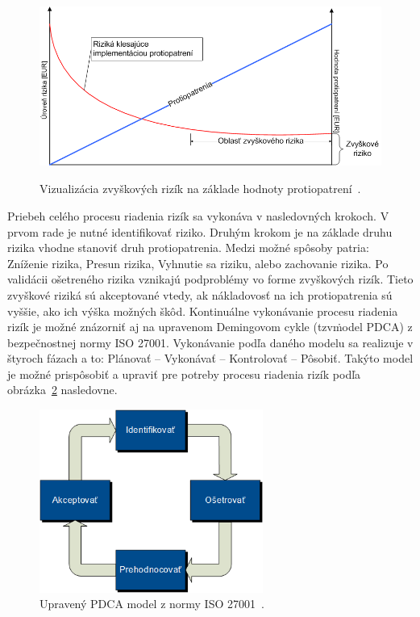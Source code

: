 \begin{figure}[H]
\begin{center}\includegraphics[width=\textwidth,height=6cm,keepaspectratio=true]{assets/zvyskove_riziko.png}\end{center}
\caption[Vizualizácia zvyškových rizík na základe hodnoty protiopatrení]{Vizualizácia zvyškových rizík na základe hodnoty protiopatrení~\cite{RiadenieRizik}.}\label{fig:obr_3}
\end{figure}

Priebeh celého procesu riadenia rizík sa vykonáva v nasledovných krokoch.
V prvom rade je nutné identifikovať riziko.
Druhým krokom je na základe druhu rizika vhodne stanoviť druh protiopatrenia.
Medzi možné spôsoby patria: Zníženie rizika, Presun rizika, Vyhnutie sa riziku, alebo zachovanie rizika.
Po validácii ošetreného rizika vznikajú podproblémy vo forme zvyškových rizík.
Tieto zvyškové riziká sú akceptované vtedy, ak nákladovosť na ich protiopatrenia sú vyššie, ako ich výška možných škôd.
Kontinuálne vykonávanie procesu riadenia rizík je možné znázorniť aj na upravenom Demingovom cykle (tzv\. model PDCA) z
bezpečnostnej normy ISO 27001.
Vykonávanie podľa daného modelu sa realizuje v štyroch fázach a to: Plánovať – Vykonávať – Kontrolovať – Pôsobiť.
Takýto model je možné prispôsobiť a upraviť pre potreby procesu riadenia rizík podľa obrázka~\ref{fig:obr_4} nasledovne.

\begin{figure}[H]
\begin{center}\includegraphics[width=\textwidth,height=6cm,keepaspectratio=true]{assets/pdca.png}\end{center}
\caption[Upravený PDCA model z normy ISO 27001]{Upravený PDCA model z normy ISO 27001~\cite{RiadenieRizik}.}\label{fig:obr_4}
\end{figure}

